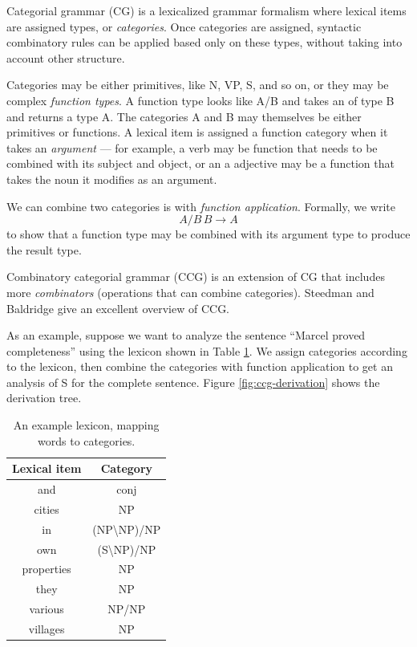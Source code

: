 \documentclass[a4paper]{article}
\begin{document}

Categorial grammar (CG) \cite{cg,bar-hillel-cg} is a lexicalized grammar formalism where lexical items are assigned types, or {\em categories}. Once categories are assigned, syntactic combinatory rules can be applied based only on these types, without taking into account other structure.

Categories may be either primitives, like N, VP, S, and so on, or they may be complex {\em function types}. A function type looks like A/B and takes an of type B and returns a type A. The categories A and B may themselves be either primitives or functions. A lexical item is assigned a function category when it takes an {\em argument} --- for example, a verb may be function that needs to be combined with its subject and object, or an a adjective may be a function that takes the noun it modifies as an argument.

We can combine two categories is with {\em function application}. Formally, we write
\begin{equation}
A/B \, B \to A \label{eqn:forward-app}
\end{equation}
to show that a function type may be combined with its argument type to produce the result type.

Combinatory categorial grammar (CCG) is an extension of CG that includes more {\em combinators} (operations that can combine categories). Steedman and Baldridge  give an excellent overview of CCG.

As an example, suppose we want to analyze the sentence ``Marcel proved completeness'' using the lexicon shown in Table \ref{table:lexicon}. We assign categories according to the lexicon, then combine the categories with function application to get an analysis of S for the complete sentence. Figure \ref{fig:ccg-derivation} shows the derivation tree.

\begin{table}
\centering
\begin{tabular}{|c|c|}
\hline
Lexical item & Category \\
\hline
and & conj \\
cities & NP \\
in &  (NP\textbackslash NP)/NP \\
own & (S\textbackslash NP)/NP \\
properties & NP \\
they & NP \\
various & NP/NP \\
villages & NP \\
\hline
\end{tabular}
\caption{An example lexicon, mapping words to categories.\label{table:lexicon}}
\end{table}
\end{document}
